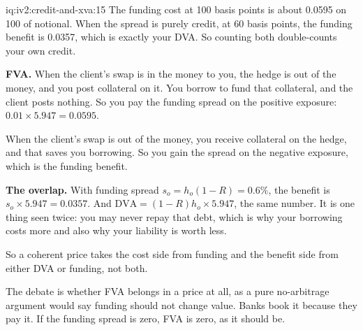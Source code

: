 \begin{solution}{iq:iv2:credit-and-xva:15}
The funding cost at 100 basis points is about 0.0595 on 100 of notional. When the spread is purely credit, at 60 basis points, the funding benefit is 0.0357, which is exactly your DVA. So counting both double-counts your own credit.

\textbf{FVA.} When the client's swap is in the money to you, the hedge is out of the money, and you post collateral on it. You borrow to fund that collateral, and the client posts nothing. So you pay the funding spread on the positive exposure: $0.01 \times 5.947 = 0.0595$.

When the client's swap is out of the money, you receive collateral on the hedge, and that saves you borrowing. So you gain the spread on the negative exposure, which is the funding benefit.

\textbf{The overlap.} With funding spread $s_o = h_o(1 - R) = 0.6\%$, the benefit is $s_o \times 5.947 = 0.0357$. And $\mathrm{DVA} = (1 - R)h_o \times 5.947$, the same number. It is one thing seen twice: you may never repay that debt, which is why your borrowing costs more and also why your liability is worth less.

So a coherent price takes the cost side from funding and the benefit side from either DVA or funding, not both.

The debate is whether FVA belongs in a price at all, as a pure no-arbitrage argument would say funding should not change value. Banks book it because they pay it. If the funding spread is zero, FVA is zero, as it should be.

\end{solution}

